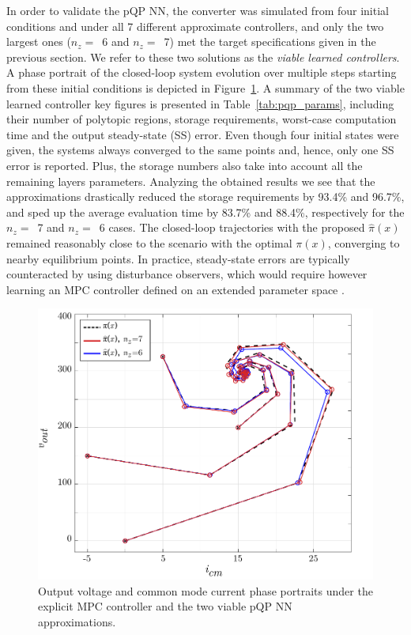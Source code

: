 In order to validate the pQP NN, the converter was simulated from four initial conditions and under all 7 different approximate controllers, and only the two largest ones ($n_z=$~6 and $n_z=$~7) met the target specifications given in the previous section. We refer to these two solutions as the \textit{viable learned controllers}. A phase portrait of the closed-loop system evolution over multiple steps starting from these initial conditions is depicted in Figure~\ref{fig:phasePortrait}. A summary of the two viable learned controller key figures is presented in Table~\ref{tab:pqp_params}, including their number of polytopic regions, storage requirements, worst-case computation time and the output steady-state (SS) error. Even though four initial states were given, the systems always converged to the same points and, hence, only one SS error is reported. Plus, the storage numbers also take into account all the remaining layers parameters. Analyzing the obtained results we see that the approximations drastically reduced the storage requirements by 93.4\% and 96.7\%, and sped up the average evaluation time by 83.7\% and 88.4\%, respectively for the $n_z=$~7 and $n_z=$~6 cases. The closed-loop trajectories with the proposed $\hat\pi(x)$ remained reasonably close to the scenario with the optimal $\pi(x)$, converging to nearby equilibrium points. In practice, steady-state errors are typically counteracted by using disturbance observers, which would require however learning an MPC controller defined on an extended parameter space \citep{pannocchia2015offset}.

\FloatBarrier

\begin{figure}[!h]
	\begin{center}
		\includegraphics[scale=0.55]{../images/chap4_simres_phase_portrait.pdf} 
		\caption{Output voltage and common mode current phase portraits under the explicit MPC controller and the two viable pQP NN approximations.} 
		\label{fig:phasePortrait}
	\end{center}
\end{figure}

